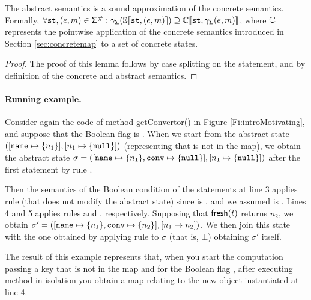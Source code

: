 \begin{lemma}
	\label{lemma:soundnessabstractsemantics}
	The abstract semantics is a sound approximation of the concrete semantics. Formally, $\forall \mathtt{st}, (e, m) \in \mathsf{\Sigma}^\#: \gamma_{\mathsf{\Sigma}}(\mathbb{S}\llbracket \mathtt{st}, (e, m) \rrbracket) \supseteq \mathbb{C}\llbracket \mathtt{st}, \gamma_{\mathsf{\Sigma}}(e, m) \rrbracket$, where $\mathbb{C}$ represents the pointwise application of the concrete semantics introduced in Section \ref{sec:concretemap} to a set of concrete states.
\end{lemma}
\begin{proof}
The proof of this lemma follows by case splitting on the statement, and by definition of the concrete and abstract semantics.
\end{proof}

\paragraph{Running example.}
Consider again the code of method {\sf getConvertor()} in Figure \ref{Fi:introMotivating}, and suppose that the Boolean flag  is . When we start from the abstract state  $([\mathtt{name} \mapsto \{n_1\}], [n_1 \mapsto \{\mathtt{null}\}])$ (representing that  is not in the map), we obtain the abstract state $\sigma = ([\mathtt{name} \mapsto \{n_1\}, \mathtt{conv} \mapsto \{\mathtt{null}\}], [n_1 \mapsto \{\mathtt{null}\}])$ after the first statement by rule . 

Then the semantics of the Boolean condition of the  statements at line 3 applies rule  (that does not modify the abstract state) since  is , and we assumed  is . 
Lines 4 and 5 applies rules  and , respectively. Supposing that $\mathsf{fresh}(t)$ returns $n_2$, we obtain $\sigma'=([\mathtt{name} \mapsto \{n_1\}, \mathtt{conv} \mapsto \{n_2\}], [n_1 \mapsto n_2])$. We then join this state with the one obtained by applying rule  to $\sigma$ (that is, $\bot$) obtaining $\sigma'$ itself.

The result of this example represents that, when you start the computation passing a key  that is not in the map and  for the Boolean flag , after executing method  in isolation you obtain a map relating  to the new object instantiated at line 4.


